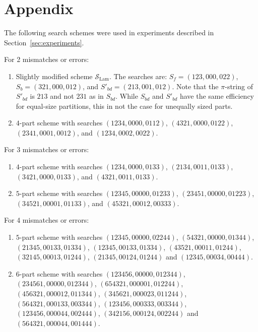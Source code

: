 \documentclass[12pt]{article}
\newcommand{\schemelam}{\mathcal{S}_{\text{Lam}}}
\begin{document}
\newpage
\section*{Appendix}
The following search schemes were used in experiments described in
Section~\ref{sec:experiments}. 

\noindent
For 2 mismatches or errors:
\begin{enumerate}
\item Slightly modified scheme $\schemelam$.
The searches are:
$S_f = (123,000,022)$, $S_b = (321,000,012)$,
and $S'_{bd} = (213,001,012)$.
Note that the $\pi$-string of $S'_{bd}$ is $213$ and not $231$ as in $S_{bd}$.
While  $S_{bd}$ and $S'_{bd}$ have the same efficiency for equal-size
partitions, this in not the case for unequally sized parts.
\item $4$-part scheme with searches
$(1234,0000,0112)$, $(4321,0000,0122)$, \linebreak[4]$(2341,0001,0012)$, and
$(1234,0002,0022)$.
\end{enumerate}

\vspace{5mm}
\noindent
For 3 mismatches or errors:
\begin{enumerate}
\item $4$-part scheme with searches 
$(1234,0000,0133)$, $(2134,0011,0133)$, \linebreak[4]$(3421,0000,0133)$, and
$(4321,0011,0133)$.
\item $5$-part scheme with searches
$(12345,00000,01233)$, $(23451,00000,01223)$, \linebreak[4]$(34521,00001,01133)$, and
$(45321,00012,00333)$.
\end{enumerate}

\vspace{5mm}
\noindent
For 4 mismatches or errors:
\begin{enumerate}
\item $5$-part scheme with searches
$(12345,00000,02244)$, $(54321,00000,01344)$, 
\linebreak[4]$(21345,00133,01334)$, $(12345,00133,01334)$, 
$(43521,00011,01244)$, \linebreak[4]$(32145,00013,01244)$, 
$(21345,00124,01244)$ and $(12345,00034,00444)$.

\item $6$-part scheme with searches
$(123456,00000,012344)$, $(234561,00000,012344)$, 
$(654321,000001,012244)$, $(456321,000012,011344)$, 
$(345621,000023,011244)$, $(564321,000133,003344)$, 
$(123456,000333,003344)$, $(123456,000044,002444)$,
$(342156,000124,002244)$ and $(564321,000044,001444)$.
\end{enumerate}
\end{document}
